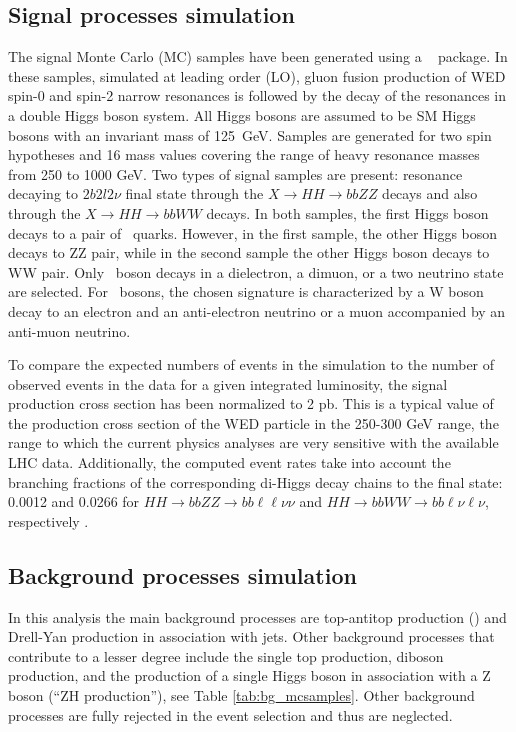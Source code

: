 \subsection{Signal processes simulation\label{sec:signalMC}}

The signal Monte Carlo (MC) samples have been generated using a {\MGMCatNLO} ~\cite{Alwall:2014hca} package. In these samples, simulated at leading order (LO), gluon fusion production of WED spin-0 and spin-2 narrow resonances is
followed by the decay of the resonances in a double Higgs boson system. All Higgs bosons are assumed to be SM Higgs bosons with an invariant mass of 125~GeV. Samples are generated for two spin hypotheses and 16 mass values covering the range of heavy resonance masses from 250 to 1000 GeV. Two types of signal samples are present: resonance decaying to $2b 2l 2\nu$ final state through the $X \rightarrow HH \rightarrow bbZZ$ decays and also through the $X \rightarrow HH \rightarrow bbWW$ decays. In both samples, the first Higgs boson decays to a pair of \PQb ~quarks. However, in the first sample, the other Higgs boson decays to ZZ pair, while in the second sample the other Higgs boson decays to WW pair. Only \PZ~boson decays in a dielectron, a dimuon, or a two neutrino state are selected. For \PW ~bosons, the chosen signature is characterized by a W boson decay to an electron and an anti-electron neutrino or a muon accompanied by an anti-muon neutrino.

To compare the expected numbers of events in the simulation to the number of observed events in the data for a given integrated luminosity, the signal production cross section has been normalized to 2 pb. This is a typical value of the production cross section of the WED particle in the 250-300 GeV range, the range to which the current physics analyses are very sensitive with the available LHC data. Additionally, the computed event rates take into account the branching fractions of the corresponding di-Higgs decay chains to the final state: 0.0012 and 0.0266 for $HH\to bbZZ\to bb\ell\ell\nu\nu$ and $HH\to bbWW\to bb\ell\nu\ell\nu$, respectively \cite{CERNYR4}.

\subsection{Background processes simulation\label{sec:bkgMC}}
In this analysis the main background processes are top-antitop production (\ttbar) and Drell-Yan production in association with jets. 
Other background processes that contribute to a lesser degree include the single top production, diboson production, and the production of a single Higgs boson in association with a Z boson (``ZH production''), see Table \ref{tab:bg_mcsamples}. Other background processes are fully rejected in the event selection and thus are neglected. 


